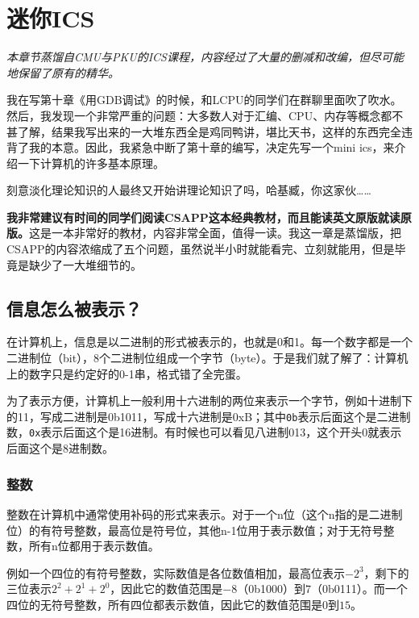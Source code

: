 \documentclass[../main.tex]{subfiles}
\begin{document}
\chapter{迷你ICS}

\begin{flushright}
    \emph{本章节蒸馏自CMU与PKU的ICS课程，内容经过了大量的删减和改编，但尽可能地保留了原有的精华。}
\end{flushright}

我在写第十章《用GDB调试》的时候，和LCPU的同学们在群聊里面吹了吹水。然后，我发现一个非常严重的问题：大多数人对于汇编、CPU、内存等概念都不甚了解，结果我写出来的一大堆东西全是鸡同鸭讲，堪比天书，这样的东西完全违背了我的本意。因此，我紧急中断了第十章的编写，决定先写一个mini ics，来介绍一下计算机的许多基本原理。

刻意淡化理论知识的人最终又开始讲理论知识了吗，哈基臧，你这家伙……

\textbf{我非常建议有时间的同学们阅读CSAPP这本经典教材，而且能读英文原版就读原版。}这是一本非常好的教材，内容非常全面，值得一读。我这一章是蒸馏版，把CSAPP的内容浓缩成了五个问题，虽然说半小时就能看完、立刻就能用，但是毕竟是缺少了一大堆细节的。

\section{信息怎么被表示？}

在计算机上，信息是以二进制的形式被表示的，也就是0和1。每一个数字都是一个二进制位（bit），8个二进制位组成一个字节（byte）。于是我们就了解了：计算机上的数字只是约定好的0-1串，格式错了全完蛋。

为了表示方便，计算机上一般利用十六进制的两位来表示一个字节，例如十进制下的11，写成二进制是0b1011，写成十六进制是0xB；其中\texttt{0b}表示后面这个是二进制数，\texttt{0x}表示后面这个是16进制。有时候也可以看见八进制013，这个开头0就表示后面这个是8进制数。

\subsection{整数}
整数在计算机中通常使用补码的形式来表示。对于一个n位（这个n指的是二进制位）的有符号整数，最高位是符号位，其他n-1位用于表示数值；对于无符号整数，所有n位都用于表示数值。

例如一个四位的有符号整数，实际数值是各位数值相加，最高位表示$-2^3$，剩下的三位表示$2^2 + 2^1 + 2^0$，因此它的数值范围是$-8$（0b1000）到$7$（0b0111）。而一个四位的无符号整数，所有四位都表示数值，因此它的数值范围是$0$到$15$。
\end{document}
